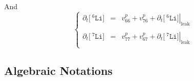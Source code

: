 \documentclass[aps,onecolumn,11pt]{revtex4}
\newcommand{\mychem}[1]{\mathtt{#1}}
\newcommand{\myconc}[1]{\big[#1\big]}
\newcommand{\spLi}[1]{{\!~^{#1}\mychem{Li}}}
\newcommand{\Li}[1]{\myconc{\spLi{#1}}}
\newcommand{\myleak}[1]{\left.{#1}\right\vert_{\mathrm{leak}}}
\begin{document}
And
\begin{equation}
\left\lbrace
\begin{array}{rcl}
	\partial_t \Li{6} & = & v^p_{66}+v^p_{76} + \partial_t \myleak{\Li{6}} \\ %
	\\
	\partial_t \Li{7} & = & v^p_{77}+v^p_{67} + \partial_t \myleak{\Li{7}} \\ %
\end{array}
\right.
\end{equation}

\subsection{Algebraic Notations}
\end{document}
